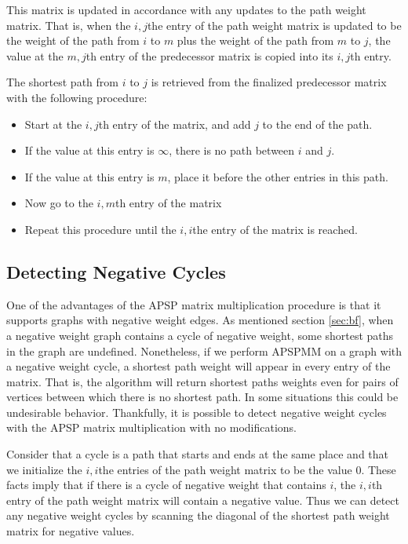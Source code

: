 \documentclass[12pt,twoside]{reedthesis}
\begin{document}
This matrix is updated in accordance with any updates to the path weight matrix. That is, when the $i,j$the entry of the path weight matrix is updated to be the weight of the path from $i$ to $m$ plus the weight of the path from $m$ to $j$, the value at the $m,j$th entry of the predecessor matrix is copied into its $i,j$th entry. 

The shortest path from $i$ to $j$ is retrieved from the finalized predecessor matrix with the following procedure:

\begin{itemize}

\item Start at the $i,j$th entry of the matrix, and add $j$ to the end of the path.

\item If the value at this entry is $\infty$, there is no path between $i$ and $j$.

\item If the value at this entry is $m$, place it before the other entries in this path.

\item Now go to the $i,m$th entry of the matrix

\item Repeat this procedure until the $i,i$the entry of the matrix is reached.

\end{itemize} 

\subsection{Detecting Negative Cycles}

One of the advantages of the APSP matrix multiplication procedure is that it supports graphs with negative weight edges. As mentioned section \ref{sec:bf}, when a negative weight graph contains a cycle of negative weight, some shortest paths in the graph are undefined. Nonetheless, if we perform APSPMM on a graph with a negative weight cycle, a shortest path weight will appear in every entry of the matrix. That is, the algorithm will return shortest paths weights even for pairs of vertices between which there is no shortest path. In some situations this could be undesirable behavior. Thankfully, it is possible to detect negative weight cycles with the APSP matrix multiplication with no modifications.

Consider that a cycle is a path that starts and ends at the same place and that we initialize the $i,i$the entries of the path weight matrix to be the value 0. These facts imply that if there is a cycle of negative weight that contains $i$, the $i,i$th entry of the path weight matrix will contain a negative value. Thus we can detect any negative weight cycles by scanning the diagonal of the shortest path weight matrix for negative values.
\end{document}
